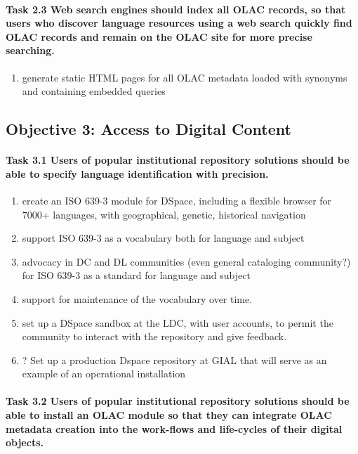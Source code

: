 \def\task{2.3}
\paragraph{Task {\task} Web search engines should index all OLAC records, so that
      users who discover language resources using a web search
      quickly find OLAC records and remain on the OLAC site for
      more precise searching.}

\begin{enumerate}[label=\textit{\task\alph*}]
\item generate static HTML pages for all OLAC metadata
  loaded with synonyms and containing embedded queries
\end{enumerate}

\subsection*{Objective 3: Access to Digital Content}

\def\task{3.1}
\paragraph{Task {\task} Users of popular institutional repository solutions should be able
  to specify language identification with precision.}

\begin{enumerate}[label=\textit{\task\alph*}]
\item create an ISO 639-3 module for DSpace, including a flexible
    browser for 7000+ languages, with geographical, genetic, historical
    navigation
\item support ISO 639-3 as a vocabulary both for language and subject
\item advocacy in DC and DL communities (even general cataloging
    community?) for ISO 639-3 as a standard for language and subject
\item support for maintenance of the vocabulary over time.
\item set up a DSpace sandbox at the LDC, with user accounts,
    to permit the community to interact with the repository and give feedback.
\item ? Set up a production Dspace repository at GIAL that will serve
    as an example of an operational installation 
\end{enumerate}

\def\task{3.2}
\paragraph{Task {\task} Users of popular institutional repository solutions should be
    able to install an OLAC module so that they can integrate OLAC
    metadata creation into the work-flows and life-cycles of their
    digital objects.}

